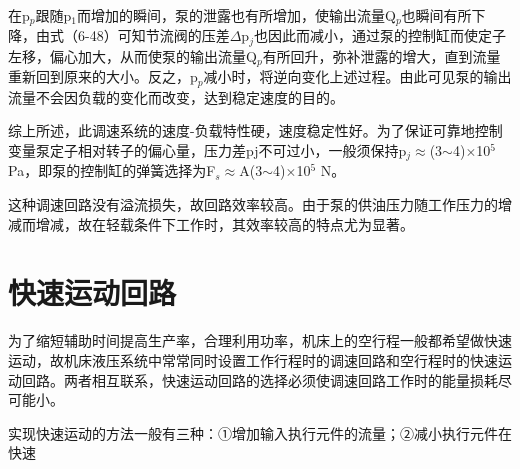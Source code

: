 在p$_p$跟随p$_1$而增加的瞬间，泵的泄露也有所增加，使输出流量Q$_p$也瞬间有所下降，由式（6-48）可知节流阀的压差$\Delta$p$_j$也因此而减小，通过泵的控制缸而使定子左移，偏心加大，从而使泵的输出流量Q$_p$有所回升，弥补泄露的增大，直到流量重新回到原来的大小。反之，p$_p$减小时，将逆向变化上述过程。由此可见泵的输出流量不会因负载的变化而改变，达到稳定速度的目的。

综上所述，此调速系统的速度-负载特性硬，速度稳定性好。为了保证可靠地控制变量泵定子相对转子的偏心量，压力差pj不可过小，一般须保持p$_j$$\approx$(3$\sim$4)$\times$10$^5$ Pa，即泵的控制缸的弹簧选择为F$_s$$\approx$A(3$\sim$4)$\times$10$^5$ N。

这种调速回路没有溢流损失，故回路效率较高。由于泵的供油压力随工作压力的增减而增减，故在轻载条件下工作时，其效率较高的特点尤为显著。

\section{快速运动回路}
为了缩短辅助时间提高生产率，合理利用功率，机床上的空行程一般都希望做快速运动，故机床液压系统中常常同时设置工作行程时的调速回路和空行程时的快速运动回路。两者相互联系，快速运动回路的选择必须使调速回路工作时的能量损耗尽可能小。

实现快速运动的方法一般有三种：①增加输入执行元件的流量；②减小执行元件在快速
